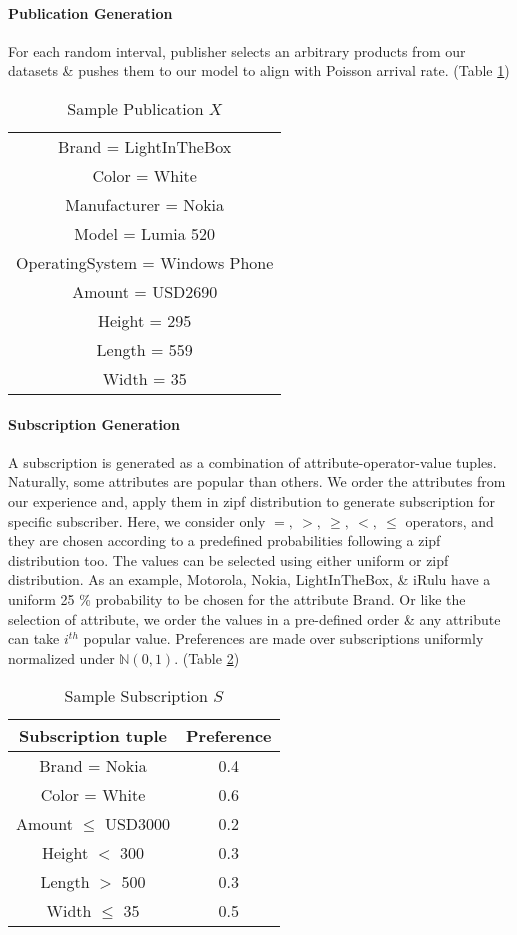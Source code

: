 \documentclass[a4paper,12pt,oneside]{book}
\theoremstyle{definition}
\theoremstyle{remark}
\begin{document}
\paragraph*{Publication Generation} For each random interval, publisher selects an arbitrary products from our datasets \& pushes them to our model to align with Poisson arrival rate. (Table \ref{table:genpub})

\begin{table}[h!]
\centering
\begin{tabular}{ |c| } 
\hline
Brand = LightInTheBox\\
Color = White\\
Manufacturer = Nokia\\
Model = Lumia 520\\
OperatingSystem = Windows Phone\\
Amount = USD2690\\
Height = 295\\
Length = 559\\
Width = 35\\
\hline
\end{tabular}
\caption{Sample Publication $X$}
\label{table:genpub}
\end{table}

\paragraph*{Subscription Generation} A subscription is generated as a combination of attribute-operator-value tuples. Naturally, some attributes are popular than others. We order the attributes from our experience and, apply them in zipf distribution to generate subscription for specific subscriber. Here, we consider only $=,\ >,\ \geq,\ <,\ \leq$ operators, and they are chosen according to a predefined probabilities following a zipf distribution too. The values can be selected using either uniform or zipf distribution. As an example, Motorola, Nokia, LightInTheBox, \& iRulu have a uniform 25 \% probability to be chosen for the attribute Brand. Or like the selection of attribute, we order the values in a pre-defined order \& any attribute can take $i^{th}$ popular value. Preferences are made over subscriptions uniformly normalized under $\mathbb{N}(0,1)$. (Table \ref{table:gensub})

\begin{table}[h!]
\centering
\begin{tabular}{ |c|c| } 
\hline
Subscription tuple & Preference\\
\hline
Brand = Nokia & 0.4\\
Color = White & 0.6\\
Amount $\leq$ USD3000 & 0.2\\
Height $<$ 300 & 0.3\\
Length $>$ 500 & 0.3\\
Width $\leq$ 35 & 0.5\\
\hline
\end{tabular}
\caption{Sample Subscription $S$}
\label{table:gensub}
\end{table}
\end{document}
